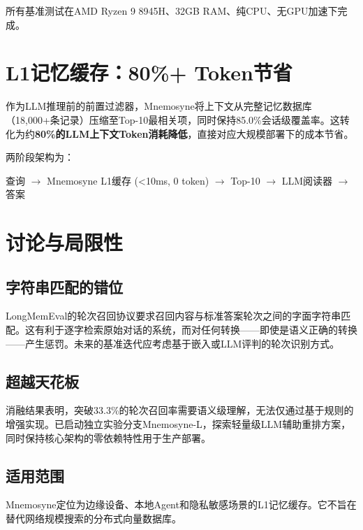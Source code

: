 \documentclass[11pt,a4paper]{ctexart}
\begin{document}
所有基准测试在AMD Ryzen 9 8945H、32GB RAM、纯CPU、无GPU加速下完成。

\section{L1记忆缓存：80\%+ Token节省}

作为LLM推理前的前置过滤器，Mnemosyne将上下文从完整记忆数据库（18,000+条记录）压缩至Top-10最相关项，同时保持85.0\%会话级覆盖率。这转化为约\textbf{80\%的LLM上下文Token消耗降低}，直接对应大规模部署下的成本节省。

两阶段架构为：
\begin{center}
查询 $\rightarrow$ Mnemosyne L1缓存 (<10ms, 0 token) $\rightarrow$ Top-10 $\rightarrow$ LLM阅读器 $\rightarrow$ 答案
\end{center}

\section{讨论与局限性}

\subsection{字符串匹配的错位}

LongMemEval的轮次召回协议要求召回内容与标准答案轮次之间的字面字符串匹配。这有利于逐字检索原始对话的系统，而对任何转换——即使是语义正确的转换——产生惩罚。未来的基准迭代应考虑基于嵌入或LLM评判的轮次识别方式。

\subsection{超越天花板}

消融结果表明，突破33.3\%的轮次召回率需要语义级理解，无法仅通过基于规则的增强实现。已启动独立实验分支Mnemosyne-L，探索轻量级LLM辅助重排方案，同时保持核心架构的零依赖特性用于生产部署。

\subsection{适用范围}

Mnemosyne定位为边缘设备、本地Agent和隐私敏感场景的L1记忆缓存。它不旨在替代网络规模搜索的分布式向量数据库。

\end{document}
